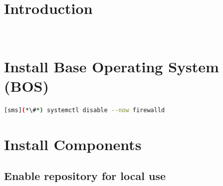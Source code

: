 \documentclass[letterpaper]{article}
\begin{document}
\graphicspath{{common/figures/}}
\thispagestyle{empty}




\newpage
\tableofcontents
\newpage


\section{Introduction} \label{sec:introduction}

 \\








\section{Install Base Operating System (BOS)}


\begin{lstlisting}[language=bash,keywords={}]
[sms](*\#*) systemctl disable --now firewalld
\end{lstlisting}


\section{Install \OHPC{} Components} \label{sec:basic_install}


\subsection{Enable \OHPC{} repository for local use} \label{sec:enable_repo}



\end{document}
